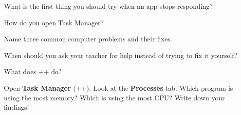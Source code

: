 \begin{reviewqs}
  \item What is the first thing you should try when an app stops responding?
  \item How do you open Task Manager?
  \item Name three common computer problems and their fixes.
  \item When should you ask your teacher for help instead of trying to fix it yourself?
  \item What does ++ do?
\end{reviewqs}

\begin{challenge}
Open \textbf{Task Manager} (++). Look at the \textbf{Processes} tab. Which program is using the most memory? Which is using the most CPU? Write down your findings!
\end{challenge}
